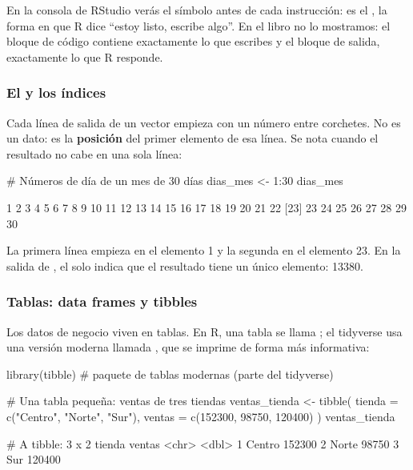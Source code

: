 En la consola de RStudio verás el símbolo \codigo{>} antes de cada
instrucción: es el , la forma en que R dice ``estoy listo,
escribe algo''. En el libro no lo mostramos: el bloque de código contiene
exactamente lo que escribes y el bloque de salida, exactamente lo que R
responde.

\subsubsection{El \texorpdfstring{\codigo{[1]}}{[1]} y los índices}

Cada línea de salida de un vector empieza con un número entre corchetes. No
es un dato: es la \textbf{posición} del primer elemento de esa línea. Se nota
cuando el resultado no cabe en una sola línea:

\begin{rcode}
# Números de día de un mes de 30 días
dias_mes <- 1:30
dias_mes
\end{rcode}

\begin{rsalida}
 [1]  1  2  3  4  5  6  7  8  9 10 11 12 13 14 15 16 17 18 19 20 21 22
[23] 23 24 25 26 27 28 29 30
\end{rsalida}

La primera línea empieza en el elemento 1 y la segunda en el elemento 23.
En la salida de , el \codigo{[1]} solo indica
que el resultado tiene un único elemento: 13380.

\subsubsection{Tablas: data frames y tibbles}

Los datos de negocio viven en tablas. En R, una tabla se llama
; el tidyverse usa una versión moderna llamada
, que se imprime de forma más informativa:

\begin{rcode}
library(tibble)   # paquete de tablas modernas (parte del tidyverse)

# Una tabla pequeña: ventas de tres tiendas
ventas_tienda <- tibble(
  tienda = c("Centro", "Norte", "Sur"),
  ventas = c(152300, 98750, 120400)
)
ventas_tienda
\end{rcode}

\begin{rsalida}
# A tibble: 3 x 2
  tienda ventas
  <chr>   <dbl>
1 Centro 152300
2 Norte   98750
3 Sur    120400
\end{rsalida}

